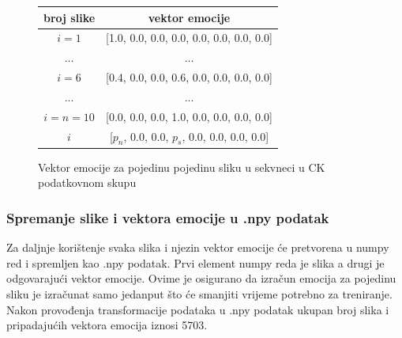 \documentclass[times, utf8, zavrsni,numeric]{fer}
\begin{document}
\begin{figure}[H]
\centering
\begin{tabular}{|c|c|} 
\hline
broj slike & vektor emocije \\
\hline
$i = 1$ & [1.0, 0.0, 0.0, 0.0, 0.0, 0.0, 0.0, 0.0] \\
... & ... \\
$i = 6$ & [0.4, 0.0, 0.0, 0.6, 0.0, 0.0, 0.0, 0.0] \\
... & ... \\
$i = n = 10$ & [0.0, 0.0, 0.0, 1.0, 0.0, 0.0, 0.0, 0.0] \\
$i$ & [$p_n$, 0.0, 0.0, $p_s$, 0.0, 0.0, 0.0, 0.0]  \\
\hline
\end{tabular}
\caption{Vektor emocije za pojedinu pojedinu sliku u sekvneci u CK podatkovnom skupu}
\label{pic:ck_emotion_rise}
\end{figure}



\subsubsection{Spremanje slike i vektora emocije u .npy podatak}\label{self:npy_save}
Za daljnje korištenje svaka slika i njezin vektor emocije će pretvorena u numpy red \cite{numpy_array} i spremljen kao .npy podatak. Prvi element numpy reda je slika a drugi je odgovarajući vektor emocije. Ovime je osigurano da izračun emocija za pojedinu sliku je izračunat samo jedanput što će smanjiti vrijeme potrebno za treniranje. Nakon provođenja transformacije podataka u .npy podatak ukupan broj slika i pripadajućih vektora emocija iznosi 5703. 
\end{document}
